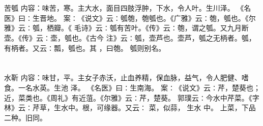 \documentclass[12pt,UTF8]{ctexbook}
\begin{document}
\section{}苦瓠
内容：味苦，寒。主大水，面目四肢浮肿，下水，令人叶。生川泽。 
《名医》曰∶生晋地。 
案∶《说文》云∶瓠匏，匏瓠也。《广雅》云∶匏，瓠也。《尔雅》云∶瓠，栖瓣。《 
毛诗》云∶瓠有苦叶。《传》云∶匏，谓之瓠。又九月断壶。《传》云∶壶，瓠也。《古今 
注》云∶瓠，壶芦也。壶芦，瓠之无柄者。瓠，有柄者。又云∶瓢，瓠也。其 ，曰匏。 
瓠则别名。 


\section{}水靳
内容：味甘，平。主女子赤沃，止血养精，保血脉，益气，令人肥健、嗜食。一名水英。生池 
泽。 
《名医》曰∶生南海。 
案∶《说文》云∶芹，楚葵也；近，菜类也。《周礼》有近菹。《尔雅》云∶芹，楚葵。 
郭璞云∶今水中芹菜。《字林》云∶芹草，生水中。根，可缘器。又云∶ 菜，似蒜， 
生水 
中。 
上菜，下品二种。旧同。 
\end{document}
